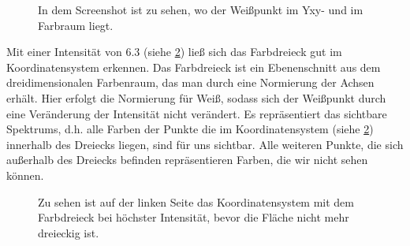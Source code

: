 \documentclass[11pt]{article}
\begin{document}
\begin{figure}[H]
\caption{In dem Screenshot ist zu sehen, wo der Weißpunkt im Yxy- und im Farbraum liegt.}
\label{weisspunkt}
\end{figure}

Mit einer Intensität von $6.3$ (siehe \ref{blau1}) ließ sich das Farbdreieck gut im Koordinatensystem erkennen. Das Farbdreieck ist ein Ebenenschnitt aus dem dreidimensionalen Farbenraum, das man durch eine Normierung der Achsen erhält. Hier erfolgt die Normierung für Weiß, sodass sich der Weißpunkt durch eine Veränderung der Intensität nicht verändert. Es repräsentiert das sichtbare Spektrums, d.h. alle Farben der Punkte die im Koordinatensystem (siehe \ref{blau1}) innerhalb des Dreiecks liegen, sind für uns sichtbar. Alle weiteren Punkte, die sich außerhalb des Dreiecks befinden repräsentieren Farben, die wir nicht sehen können. 

\begin{figure}[H]
\caption{Zu sehen ist auf der linken Seite das Koordinatensystem mit dem Farbdreieck bei höchster Intensität, bevor die Fläche nicht mehr dreieckig ist.}
\label{blau1}
\end{figure}
\end{document}
